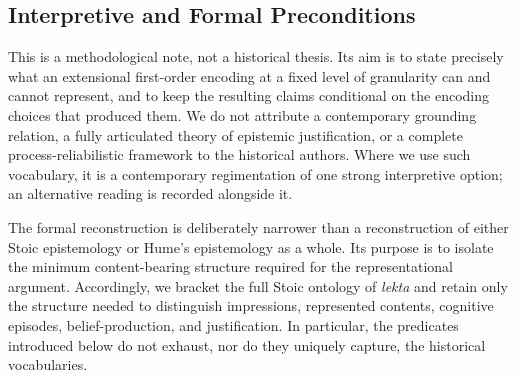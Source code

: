 %
%

\subsection{Interpretive and Formal Preconditions}
\label{sec:formal-preconditions}

This is a methodological note, not a historical thesis. Its aim is to
state precisely what an extensional first-order encoding at a fixed
level of granularity can and cannot represent, and to keep the resulting
claims conditional on the encoding choices that produced them. We do
not attribute a contemporary grounding relation, a fully articulated
theory of epistemic justification, or a complete process-reliabilistic
framework to the historical authors. Where we use such vocabulary, it
is a contemporary regimentation of one strong interpretive option; an
alternative reading is recorded alongside it.

The formal reconstruction is deliberately narrower than a reconstruction
of either Stoic epistemology or Hume's epistemology as a whole. Its
purpose is to isolate the minimum content-bearing structure required for
the representational argument. Accordingly, we bracket the full Stoic
ontology of \emph{lekta} and retain only the structure needed to
distinguish impressions, represented contents, cognitive episodes,
belief-production, and justification. In particular, the predicates
introduced below do not exhaust, nor do they uniquely capture, the
historical vocabularies.

